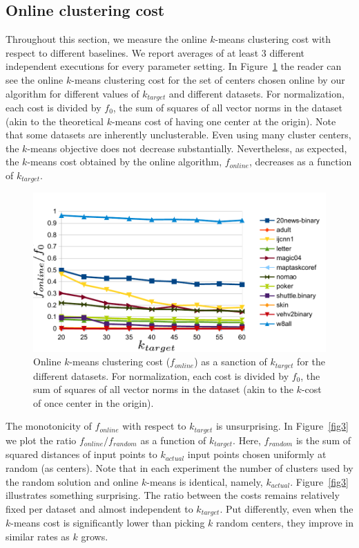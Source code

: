 \documentclass{article}
\begin{document}
\subsection{Online clustering cost}
Throughout this section, we measure the online $k$-means clustering cost with respect to different baselines. We report averages of at least 3 different independent executions for every parameter setting.
In Figure~\ref{fig2} the reader can see the online $k$-means clustering cost for the set of centers chosen online by our algorithm for different values of $k_{target}$ and different datasets.
For normalization, each cost is divided by $f_0$, the sum of squares of all vector norms in the dataset (akin to the theoretical $k$-means cost of having one center at the origin).
Note that some datasets are inherently unclusterable. Even using many cluster centers, the $k$-means objective does not decrease substantially.
Nevertheless, as expected, the $k$-means cost obtained by the online algorithm, $f_{online}$, decreases as a function of $k_{target}$. 

\begin{figure}[htbp]
\begin{center}
\includegraphics{figures/plot2.pdf}
\caption{Online $k$-means clustering cost ($f_{online}$) as a sanction of $k_{target}$ for the different datasets.
For normalization, each cost is divided by $f_0$, the sum of squares of all vector norms in the dataset (akin to the $k$-cost of once center in the origin).}
\label{fig2}
\end{center}
\end{figure}

The monotonicity of $f_{online}$ with respect to $k_{target}$ is unsurprising.
In Figure~\ref{fig3} we plot the ratio $f_{online}/f_{random}$ as a function of $k_{target}$.
Here, $f_{random}$ is the sum of squared distances of input points to $k_{actual}$  input points chosen uniformly at random (as centers).
Note that in each experiment the number of clusters used by the random solution and online $k$-means is identical, namely, $k_{actual}$.
Figure~\ref{fig3} illustrates something surprising. The ratio between the costs remains relatively fixed per dataset and almost independent to $k_{target}$.
Put differently, even when the $k$-means cost is significantly lower than picking $k$ random centers, they improve in similar rates as $k$ grows.
\end{document}
